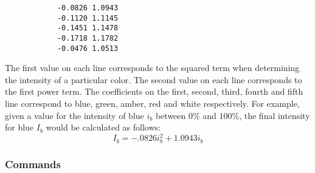 \documentclass[twoside]{article}
\begin{document}
\begin{enumerate}
		\begin{verbatim}
			-0.0826	1.0943
			-0.1120	1.1145
			-0.1451	1.1478
			-0.1718	1.1782
			-0.0476	1.0513
		\end{verbatim}
		
		The first value on each line corresponds to the squared term when determining the intensity of a particular color. The second value on each line corresponds to the first power term. The coefficients on the first, second, third, fourth and fifth line correspond to blue, green, amber, red and white respectively. For example, given a value for the intensity of blue $i_b$ between 0\% and 100\%, the final intensity for blue $I_b$ would be calculated as follows:
		\[I_b = -.0826i_b^2+1.0943i_b\]
	\end{enumerate}

	
	

	
	\subsubsection{Commands}
	
\end{document}
